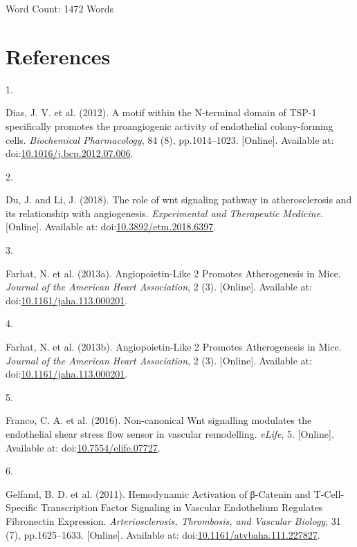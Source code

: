 \documentclass[
  11pt,
]{article}
\newlength{\cslhangindent}
\newlength{\csllabelwidth}
\newlength{\cslentryspacingunit} %
\newenvironment{CSLReferences}[2] %
 {%
  \setlength{\parindent}{0pt}
  \ifodd #1
  \let\oldpar\par
  \def\par{\hangindent=\cslhangindent\oldpar}
  \fi
  \setlength{\parskip}{#2\cslentryspacingunit}
 }%
 {}
\newcommand{\CSLLeftMargin}[1]{\parbox[t]{\csllabelwidth}{#1}}
\newcommand{\CSLRightInline}[1]{\parbox[t]{\linewidth - \csllabelwidth}{#1}\break}
\begin{document}
\begin{flushright}
Word Count: 1472 Words
\end{flushright}

\hypertarget{references}{%
\section{References}\label{references}}

\small

\hypertarget{refs}{}
\begin{CSLReferences}{0}{0}
\leavevmode{}%
\CSLLeftMargin{1. }
\CSLRightInline{Dias, J. V. {et al.} (2012). {A motif within the N-terminal domain of TSP-1 specifically promotes the proangiogenic activity of endothelial colony-forming cells}. \emph{Biochemical Pharmacology}, 84 (8), pp.1014--1023. {[}Online{]}. Available at: doi:\href{https://doi.org/10.1016/j.bcp.2012.07.006}{10.1016/j.bcp.2012.07.006}.}

\leavevmode{}%
\CSLLeftMargin{2. }
\CSLRightInline{Du, J. and Li, J. (2018). {The role of wnt signaling pathway in atherosclerosis and its relationship with angiogenesis}. \emph{Experimental and Therapeutic Medicine}. {[}Online{]}. Available at: doi:\href{https://doi.org/10.3892/etm.2018.6397}{10.3892/etm.2018.6397}.}

\leavevmode{}%
\CSLLeftMargin{3. }
\CSLRightInline{Farhat, N. {et al.} (2013a). {Angiopoietin{-}Like 2 Promotes Atherogenesis in Mice}. \emph{Journal of the American Heart Association}, 2 (3). {[}Online{]}. Available at: doi:\href{https://doi.org/10.1161/jaha.113.000201}{10.1161/jaha.113.000201}.}

\leavevmode{}%
\CSLLeftMargin{4. }
\CSLRightInline{Farhat, N. {et al.} (2013b). {Angiopoietin{-}Like 2 Promotes Atherogenesis in Mice}. \emph{Journal of the American Heart Association}, 2 (3). {[}Online{]}. Available at: doi:\href{https://doi.org/10.1161/jaha.113.000201}{10.1161/jaha.113.000201}.}

\leavevmode{}%
\CSLLeftMargin{5. }
\CSLRightInline{Franco, C. A. {et al.} (2016). {Non-canonical Wnt signalling modulates the endothelial shear stress flow sensor in vascular remodelling}. \emph{eLife}, 5. {[}Online{]}. Available at: doi:\href{https://doi.org/10.7554/elife.07727}{10.7554/elife.07727}.}

\leavevmode{}%
\CSLLeftMargin{6. }
\CSLRightInline{Gelfand, B. D. {et al.} (2011). {Hemodynamic Activation of β-Catenin and T-Cell-Specific Transcription Factor Signaling in Vascular Endothelium Regulates Fibronectin Expression}. \emph{Arteriosclerosis, Thrombosis, and Vascular Biology}, 31 (7), pp.1625--1633. {[}Online{]}. Available at: doi:\href{https://doi.org/10.1161/atvbaha.111.227827}{10.1161/atvbaha.111.227827}.}


\end{CSLReferences}
\end{document}
